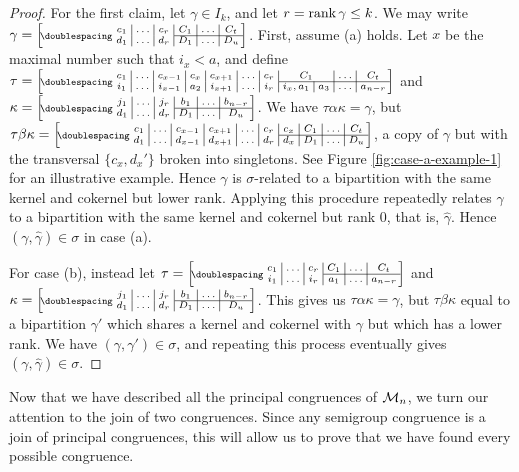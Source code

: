 \begin{lemma}
\begin{proof}
    For the first claim, let $\gamma \in I_k$, and let $r = \operatorname{rank}\gamma \leq k$.
    We may write $\gamma = \bipart{c|c|c|c|c|c}{4-6}
    {c_1 & \ldots & c_r & C_1 & \ldots & C_t}
    {d_1 & \ldots & d_r & D_1 & \ldots & D_u}$.
    First, assume (a) holds.
    Let $x$ be the maximal number such that $i_x < a$, and define
    $\tau = \bipart{c|c|c|c|c|c|c|c|c|c|c}{8-11}
    {c_1 & \ldots & c_{x-1} & c_x & c_{x+1} & \ldots & c_r
      & \mc2{c|}{C_1} & \ldots & C_t}
    {i_1 & \ldots & i_{x-1} & a_2 & i_{x+1} & \ldots & i_r
      & i_x, a_1 & a_3 & \ldots & a_{n-r}}$
    and $\kappa = \bipart{c|c|c|c|c|c}{4-6}
    {j_1 & \ldots & j_r & b_1 & \ldots & b_{n-r}}
    {d_1 & \ldots & d_r & D_1 & \ldots & D_u}$.
    We have $\tau\alpha\kappa = \gamma$, but
    $\tau\beta\kappa = \bipart{c|c|c|c|c|c|c|c|c|c}{7-10}
    {c_1 & \ldots & c_{x-1} & c_{x+1} & \ldots & c_r & c_x
      & C_1 & \ldots & C_t}
    {d_1 & \ldots & d_{x-1} & d_{x+1} & \ldots & d_r & d_x
      & D_1 & \ldots & D_u}$,
    a copy of $\gamma$ but with the transversal $\{c_x, d_x'\}$ broken into
    singletons.  See Figure \ref{fig:case-a-example-1} for an illustrative
    example.  Hence $\gamma$ is $\sigma$-related to a bipartition with the same
    kernel and cokernel but lower rank.  Applying this procedure repeatedly
    relates $\gamma$ to a bipartition with the same kernel and cokernel but rank
    $0$, that is, $\widehat\gamma$.  Hence $(\gamma, \widehat\gamma) \in \sigma$
    in case (a).

    For case (b), instead let
    $\tau = \bipart{c|c|c|c|c|c}{4-6}
    {c_1 & \ldots & c_r & C_1 & \ldots & C_t}
    {i_1 & \ldots & i_r & a_1 & \ldots & a_{n-r}}$ and
    $\kappa = \bipart{c|c|c|c|c|c}{4-6}
    {j_1 & \ldots & j_r & b_1 & \ldots & b_{n-r}}
    {d_1 & \ldots & d_r & D_1 & \ldots & D_u}$.
    This gives us $\tau\alpha\kappa = \gamma$, but $\tau\beta\kappa$ equal to a
    bipartition $\gamma'$ which shares a kernel and cokernel with $\gamma$ but
    which has a lower rank.  We have $(\gamma, \gamma') \in \sigma$, and
    repeating this process eventually gives
    $(\gamma, \widehat\gamma) \in \sigma$.
  \end{proof}
\end{lemma}

Now that we have described all the principal congruences of $\mathcal{M}_n$, we turn
our attention to the join of two congruences.  Since any semigroup congruence is
a join of principal congruences, this will allow us to prove that we have found
every possible congruence.

